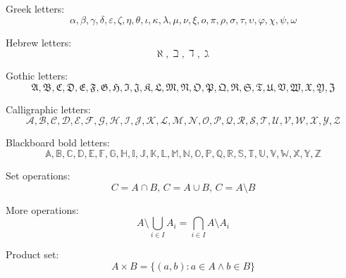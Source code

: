 \documentclass{article}
\begin{document}
Greek letters:
    \[
        \alpha, \beta, \gamma, \delta, \varepsilon, \zeta, \eta, \theta,
        \iota, \kappa, \lambda, \mu, \nu, \xi, o, \pi, \rho, \sigma, \tau, 
        \upsilon, \varphi, \chi, \psi, \omega   
    \]

Hebrew letters:
    \[
        \aleph, \beth, \daleth, \gimel   
    \]

Gothic letters:
    \[
        \mathfrak{A, B, C, D, E, F, G, H, I, J, K, L, M, N, O, P,
        Q, R, S, T, U, V, W, X, Y, Z}
    \]

Calligraphic letters:
    \[
        \mathcal{A, B, C, D, E, F, G, H, I, J, K, L, M, N, O, P, 
        Q, R, S, T, U, V, W, X, Y, Z}
    \]

Blackboard bold letters:
    \[
        \mathbb{A, B, C, D, E, F, G, H, I, J, K, L, M, N ,O, P,
        Q, R, S, T, U, V, W, X, Y, Z}
    \]

Set operations:
    \[
        C = A\cap B,\, C = A\cup B, \, C = A\setminus B 
    \]

More operations:
    \[
    A\setminus \bigcup_{i\in I} A_i = \bigcap_{i\in I}A\setminus A_i 
    \]

Product set:
\[
    A\times B = \{ (a, b): a\in A \wedge b\in B \} 
    \]
\end{document}
